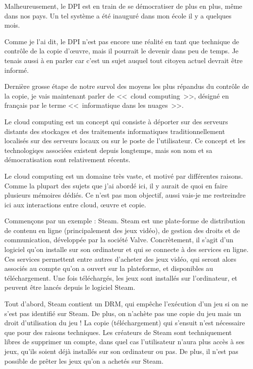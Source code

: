 Malheureusement, le DPI est en train de se démocratiser de plus en plus, même dans nos pays.
Un tel système a été inauguré dans mon école il y a quelques mois.

Comme je l'ai dit, le DPI n'est pas encore une réalité en tant que technique de contrôle de la copie d'œuvre, mais il pourrait le devenir dans peu de temps.
Je tenais aussi à en parler car c'est un sujet auquel tout citoyen actuel devrait être informé.

Dernière grosse étape de notre survol des moyens les plus répandus du contrôle de la copie, je vais maintenant parler de <<~cloud computing~>>, désigné en français par le terme <<~informatique dans les nuages~>>.

Le cloud computing est un concept qui consiste à déporter sur des serveurs distants des stockages et des traitements informatiques traditionnellement localisés sur des serveurs locaux ou sur le poste de l'utilisateur.
Ce concept et les technologiqes associées existent depuis longtemps, mais son nom et sa démocratisation sont relativement récents.

Le cloud computing est un domaine très vaste, et motivé par différentes raisons.
Comme la plupart des sujets que j'ai abordé ici, il y aurait de quoi en faire plusieurs mémoires dédiés.
Ce n'est pas mon objectif, aussi vais-je me restreindre ici aux interactions entre cloud, œuvre et copie.

Commençons par un exemple : Steam.
Steam est une plate-forme de distribution de contenu en ligne (principalement des jeux vidéo), de gestion des droits et de communication, développée par la société Valve.
Concrètement, il s'agit d'un logiciel qu'on installe sur son ordinateur et qui se connecte à des services en ligne.
Ces services permettent entre autres d'acheter des jeux vidéo, qui seront alors associés au compte qu'on a ouvert sur la plateforme, et disponibles au téléchargement.
Une fois téléchargés, les jeux sont installés sur l'ordinateur, et peuvent être lancés depuis le logiciel Steam.

Tout d'abord, Steam contient un DRM, qui empêche l'exécution d'un jeu si on ne s'est pas identifié sur Steam.
De plus, on n'achète pas une copie du jeu mais un droit d'utilisation du jeu !
La copie (téléchargement) qui s'ensuit n'est nécessaire que pour des raisons techniques.
Les créateurs de Steam sont techniquement libres de supprimer un compte, dans quel cas l'utilisateur n'aura plus accès à ses jeux, qu'ils soient déjà installés sur son ordinateur ou pas.
De plus, il n'est pas possible de prêter les jeux qu'on a achetés sur Steam.

